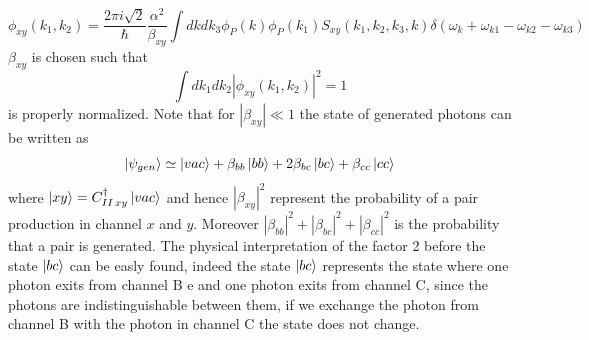 \begin{equation}\label{biphoton}\phi_{xy}(k_1,k_2) = \frac{2\pi i \sqrt{2}}{\hbar} \frac{\alpha^2}{\beta_{xy}}\int dk dk_3\phi_P(k)\phi_P(k_1)S_{xy}(k_1,k_2,k_3,k)\delta(\omega_{k}+\omega_{k1}-\omega_{k2}-\omega_{k3}) \end{equation}
$\beta_{xy}$ is chosen such that
\begin{equation}\int dk_1 dk_2 |\phi_{xy}(k_1,k_2)|^2 = 1\end{equation}
is properly normalized. Note that for $|\beta_{xy}| \ll 1 $ the state of generated photons can be written as
\begin{equation}\ket{\psi_{gen}} \simeq \ket{vac} + \beta_{bb}\ket{bb}+2\beta_{bc}\ket{bc}+ \beta_{cc}\ket{cc} \end{equation}
where $\ket{xy} = C_{II\, xy}^\dagger\ket{vac}$ and hence $|\beta_{xy}|^2$ represent the probability of a pair production in channel $x$ and $y$. Moreover
$|\beta_{bb}|^2 + |\beta_{bc}|^2 +|\beta_{cc}|^2$ is the probability that a pair is generated. The physical interpretation of the factor 2 before the state $\ket{bc}$ can be easly found, indeed the state $\ket{bc}$ represents the state where one photon exits from channel B e and one photon exits from channel C, since the photons are indistinguishable between them, if we exchange the photon from channel B with the photon in channel C the state does not change.
